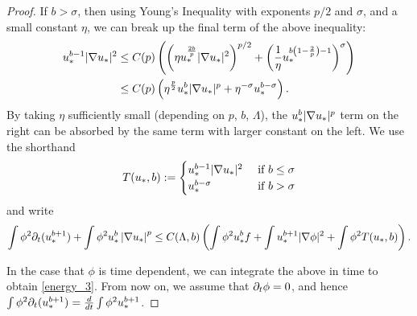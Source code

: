 \begin{proof}
If $b > \sigma$, then using Young's Inequality with exponents $p/2$ and $\sigma$, and a small constant $\eta$, we can break up the final term of the above inequality:
\begin{align*} 
u_*^{b-1}|\nabla u_*|^2 &\leq C(p) \left(  \left(  \eta u_*^\frac{2b}{p} |\nabla u_*|^2 \right)^{p/2} + \left( \frac{1}{\eta} u_*^{b\left( 1-\frac{2}{p} \right)-1} \right)^\sigma  \right)
\\ &\leq C(p) \left(  \eta^\frac{p}{2} u_*^b |\nabla u_*|^p + \eta^{-\sigma} u_*^{b-\sigma}  \right). 
\end{align*}
By taking $\eta$ sufficiently small (depending on $p$, $b$, $\Lambda$), the $u_*^b|\nabla u_*|^p$ term on the right can be absorbed by the same term with larger constant on the left.  We use the shorthand 
\[ T(u_*,b) := \begin{cases} 
      u_*^{b-1} |\nabla u_*|^2 & \textrm{ if $b \leq \sigma$} \\
      u_*^{b-\sigma} & \textrm{ if $b > \sigma$} \\
   \end{cases} \]
and write
\[ \int \phi^2 \partial_t(u_*^{b+1}) + \int \phi^2 u_*^b \left\lvert \nabla u_* \right\rvert^p \leq C(\Lambda,b) \left(  \int \phi^2 u_*^b f + \int u_*^{b+1} |\nabla \phi|^2 + \int \phi^2 T(u_*,b)  \right). \]

In the case that $\phi$ is time dependent, we can integrate the above in time to obtain \eqref{energy_3}.  From now on, we assume that $\partial_t \phi = 0$, and hence $\int \phi^2 \partial_t(u_*^{b+1}) = \frac{d}{dt} \int \phi^2 u_*^{b+1}$.  


\end{proof}
